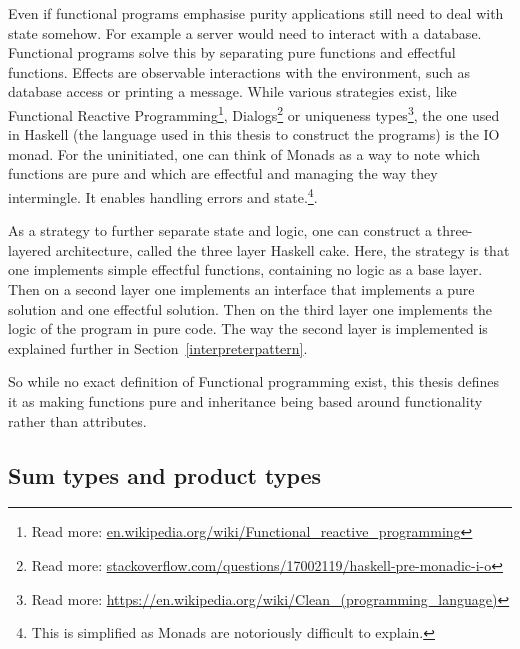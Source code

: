 \begin{description}
Even if functional programs emphasise purity applications still need to deal
        with state somehow. For example a server would need to interact with a
        database. Functional programs solve this by separating pure functions
        and effectful functions. Effects are observable interactions with the
        environment, such as database access or printing a message.  While
        various strategies exist, like Functional Reactive
        Programming\footnote{Read more:
        \url{en.wikipedia.org/wiki/Functional_reactive_programming}},
        Dialogs\footnote{Read more:
        \url{stackoverflow.com/questions/17002119/haskell-pre-monadic-i-o}} or
        uniqueness types\footnote{Read more:
        \url{https://en.wikipedia.org/wiki/Clean_(programming_language)}}, the
        one used in Haskell (the language used in this thesis to construct the
        programs) is the IO monad. For the uninitiated, one can think of Monads
        as a way to note which functions are pure and which are effectful and
        managing the way they intermingle. It enables handling errors
        and state.\footnote{This is simplified as Monads are notoriously
        difficult to explain.}. 

As a strategy to further separate state and logic, one can construct a
        three-layered architecture, called the three layer Haskell cake. Here,
        the strategy is that one implements simple effectful functions,
        containing no logic as a base layer. Then on a second layer one
        implements an interface that implements a pure solution and one
        effectful solution. Then on the third layer one implements the logic of
        the program in pure code. The way the second layer is implemented is
        explained further in Section~\ref{interpreterpattern}. 
\end{description}

So while no exact definition of Functional programming exist, this thesis
defines it as making functions pure and inheritance being based around
functionality rather than attributes.

\subsection{Sum types and product types}\label{types}

